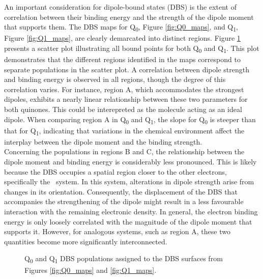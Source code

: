 An important consideration for dipole-bound states (DBS) is the extent of correlation between their binding energy and the strength of the dipole moment that supports them. The DBS maps for Q\textsubscript{0}, Figure \ref{fig:Q0_maps}, and Q\textsubscript{1}, Figure \ref{fig:Q1_maps}, are clearly demarcated into distinct regions. Figure \ref{fig:D_vsDBS} presents a scatter plot illustrating all bound points for both Q\textsubscript{0} and Q\textsubscript{1}. This plot demonstrates that the different regions identified in the maps correspond to separate populations in the scatter plot. A correlation between dipole strength and binding energy is observed in all regions, though the degree of this correlation varies. For instance, region A, which accommodates the strongest dipoles, exhibits a nearly linear relationship between these two parameters for both quinones. This could be interepreted as the molecule acting as an ideal dipole. When comparing region A in Q\textsubscript{0} and Q\textsubscript{1}, the slope for Q\textsubscript{0} is steeper than that for Q\textsubscript{1}, indicating that variations in the chemical environment affect the interplay between the dipole moment and the binding strength.\\

Concerning the populations in regions B and C, the relationship between the dipole moment and binding energy is considerably less pronounced. This is likely because the DBS occupies a spatial region closer to the other electrons, specifically the \textpi\ system. In this system, alterations in dipole strength arise from changes in its orientation. Consequently, the displacement of the DBS that accompanies the strengthening of the dipole might result in a less favourable interaction with the remaining electronic density.
In general, the electron binding energy is only loosely correlated with the magnitude of the dipole moment that supports it. However, for analogous systems, such as region A, these two quantities become more significantly interconnected.\\

\begin{figure}[th!]
    \centering
    \small
     
    \caption[Q\textsubscript{0} and Q\textsubscript{1} DBS populations]{Q\textsubscript{0} and Q\textsubscript{1} DBS populations assigned to the DBS surfaces from Figures \ref{fig:Q0_maps} and \ref{fig:Q1_maps}.}
    \label{fig:D_vsDBS}
\end{figure}

